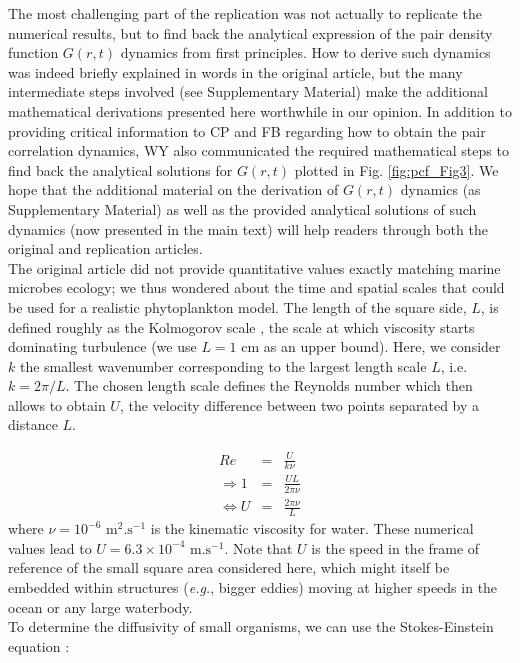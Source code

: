 The most challenging part of the replication was not actually to replicate the numerical results, but to find back the analytical expression of the pair density function $G(r,t)$ dynamics from first principles. How to derive such dynamics was indeed briefly explained in words in the original article, but the many intermediate steps involved (see Supplementary Material) make the additional mathematical derivations presented here worthwhile in our opinion. In addition to providing critical information to CP and FB regarding how to obtain the pair correlation dynamics, WY also communicated the required mathematical steps to find back the analytical solutions for $G(r,t)$ plotted in Fig. \ref{fig:pcf_Fig3}. We hope that the additional material on the derivation of $G(r,t)$ dynamics (as Supplementary Material) as well as the provided analytical solutions of such dynamics (now presented in the main text) will help readers through both the original and replication articles. \\

The original article did not provide quantitative values exactly matching marine microbes ecology; we thus wondered about the time and spatial scales that could be used for a realistic phytoplankton model. The length of the square side, $L$, is defined roughly as the Kolmogorov scale \citep{tennekes1972first}, the scale at which viscosity starts dominating turbulence  (we use $L= 1$ cm as an upper bound). Here, we consider $k$ the smallest wavenumber corresponding to the largest length scale $L$, i.e. $k=2\pi/L$. The chosen length scale defines the Reynolds number which then allows to obtain $U$, the velocity difference between two points separated by a distance $L$.  
 
\begin{eqnarray}
 Re & = &\frac{U}{k\nu}\\
\Rightarrow 1 & = & \frac{UL}{2\pi\nu}\\
\Leftrightarrow U & = &\frac{2\pi\nu}{L}
\end{eqnarray}
% 
where $\nu=10^{-6} \text{ m}^{2}.\text{s}^{-1}$ is the kinematic viscosity for water. These numerical values lead to $U=6.3\times10^{-4} \text{ m.s}^{-1}$. Note that $U$ is the speed in the frame of reference of the small square area considered here, which might itself be embedded within structures (\textit{e.g.}, bigger eddies) moving at higher speeds in the ocean or any large waterbody.\\

To determine the diffusivity of small organisms, we can use the Stokes-Einstein equation \citep{einstein1905molekularkinetischen}:

